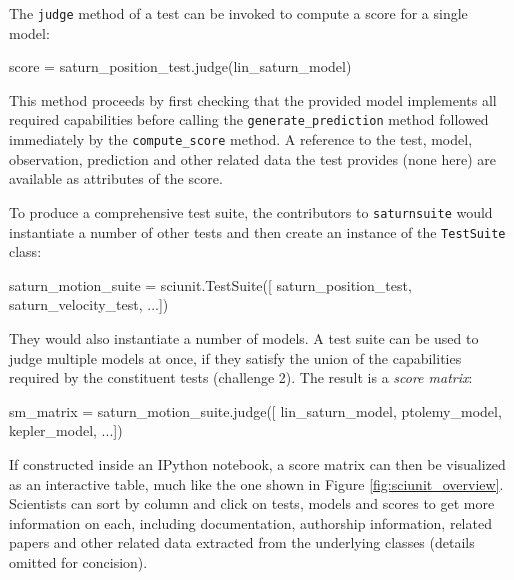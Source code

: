 \documentclass[9pt]{sig-alternate}
\newcommand{\verbx}[1]{\lstinline{#1}}
\begin{document}
The \verbx{judge} method of a test can be invoked to compute a score for a single model: 
\vspace{-4px}
\begin{python}
score = saturn_position_test.judge(lin_saturn_model)
\end{python}
\vspace{-5px}
This method proceeds by first checking that the provided model implements all required capabilities before calling the \verbx{generate_prediction} method followed immediately by the \verbx{compute_score} method. A reference to the test,   model, observation, prediction and other related data the test provides (none here) are available as attributes of the score.

To produce a comprehensive test suite, the contributors to \verbx{saturnsuite} would instantiate a number of other tests and then create an instance of the \verbx{TestSuite} class:
\begin{python}
saturn_motion_suite = sciunit.TestSuite([
  saturn_position_test, saturn_velocity_test, ...])
\end{python}
They would also instantiate a number of models. A test suite can be used to judge multiple models at once, if they satisfy the union of the capabilities required by the constituent tests (challenge 2). The result is a \emph{score matrix}:
\begin{python}
sm_matrix = saturn_motion_suite.judge([
  lin_saturn_model, ptolemy_model, kepler_model, ...])
\end{python}

If constructed inside an IPython notebook, a score matrix can then be visualized as an interactive table, much like the one shown in Figure \ref{fig:sciunit_overview}. Scientists can sort by column and click on tests, models and scores to get more information on each, including documentation, authorship information, related papers and other related data extracted from the underlying classes (details omitted for concision).

 
\end{document}
